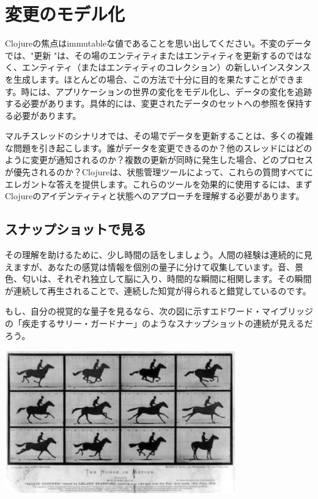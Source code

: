 \section{変更のモデル化}

Clojureの焦点はimmutableな値であることを思い出してください。不変のデータでは、"更新 "は、その場のエンティティまたはエンティティを更新するのではなく、エンティティ（またはエンティティのコレクション）の新しいインスタンスを生成します。ほとんどの場合、この方法で十分に目的を果たすことができます。時には、アプリケーションの世界の変化をモデル化し、データの変化を追跡する必要があります。具体的には、変更されたデータのセットへの参照を保持する必要があります。

マルチスレッドのシナリオでは、その場でデータを更新することは、多くの複雑な問題を引き起こします。誰がデータを変更できるのか？他のスレッドにはどのように変更が通知されるのか？複数の更新が同時に発生した場合、どのプロセスが優先されるのか？Clojureは、状態管理ツールによって、これらの質問すべてにエレガントな答えを提供します。これらのツールを効果的に使用するには、まずClojureのアイデンティティと状態へのアプローチを理解する必要があります。

\subsection{スナップショットで見る}

その理解を助けるために、少し時間の話をしましょう。人間の経験は連続的に見えますが、あなたの感覚は情報を個別の量子に分けて収集しています。音、景色、匂いは、それぞれ独立して脳に入り、時間的な瞬間に相関します。その瞬間が連続して再生されることで、連続した知覚が得られると錯覚しているのです。

もし、自分の視覚的な量子を見るなら、次の図に示すエドワード・マイブリッジの「疾走するサリー・ガードナー」のようなスナップショットの連続が見えるだろう。

\includegraphics[width=10cm]{fig_04_001.eps}



